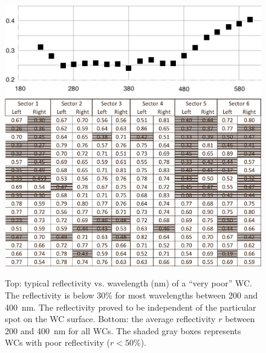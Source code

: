 \begin{figure}[!ht]
	\centering
	\includegraphics[width=0.98\columnwidth,keepaspectratio]{img/winstoConeSample2Reflectivity.png}
	\includegraphics[width=0.98\columnwidth,keepaspectratio]{img/wcStatusBefore.png}
	\caption{Top: typical reflectivity vs. wavelength (nm) of a ``very poor'' WC. The reflectivity is below 30\% for
          most wavelengths between 200 and 400~nm. The reflectivity proved to be independent of the particular spot
          on the WC surface. Bottom: the average reflectivity $r$ between 200 and 400~nm for all WCs. The shaded
          gray boxes represents WCs with poor reflectivity ($r < 50$\%).}
	\label{fig:wcStatusBefore}
\end{figure}

